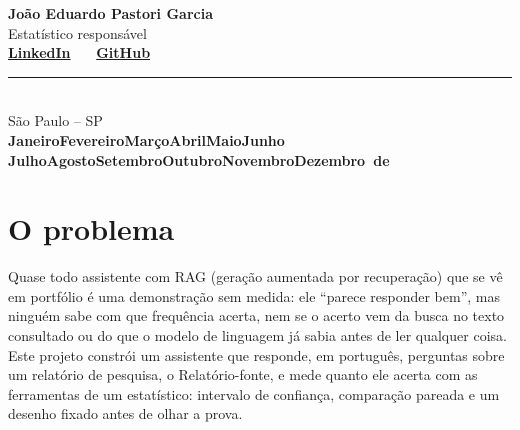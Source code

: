 \documentclass[11pt,a4paper]{article}
\newcommand{\AutorNome}{João Eduardo Pastori Garcia}
\newcommand{\AutorPapel}{Estatístico responsável}
\newcommand{\AutorLinkedIn}{https://www.linkedin.com/in/joao-eduardo-garcia/}
\newcommand{\AutorGitHub}{https://github.com/JoaoEPGarcia}
\newcommand{\LocalCapa}{São Paulo -- SP}
\newcommand{\DataCapa}{\ifcase\month\or Janeiro\or Fevereiro\or Março\or Abril\or Maio\or Junho\or
  Julho\or Agosto\or Setembro\or Outubro\or Novembro\or Dezembro\fi\ de \number\year}
\begin{document}
\begin{titlepage}
  \begin{minipage}{0.85\textwidth}
    \centering
    {\large\bfseries \AutorNome} \\
    {\normalsize\color{tinta2} \AutorPapel} \\[0.15cm]
    {\footnotesize
     \href{\AutorLinkedIn}{\color{vermelho}\textbf{LinkedIn}} \ \textperiodcentered\ \
     \href{\AutorGitHub}{\color{vermelho}\textbf{GitHub}}}
  \end{minipage}

  \vfill

  {\color{tinta2}\rule{4cm}{0.5pt}} \\[0.3cm]
  {\small\color{tinta2} \LocalCapa \\ \bfseries \DataCapa}
\end{titlepage}

\tableofcontents
\clearpage



\section{O problema}

Quase todo assistente com RAG (geração aumentada por recuperação) que se vê
em portfólio é uma demonstração sem medida: ele ``parece responder bem'', mas
ninguém sabe com que frequência acerta, nem se o acerto vem da busca no
texto consultado ou do que o modelo de linguagem já sabia antes de ler qualquer
coisa. Este projeto constrói um assistente que responde, em português,
perguntas sobre um relatório de pesquisa, o Relatório-fonte, e mede quanto ele acerta com as
ferramentas de um estatístico: intervalo de confiança, comparação pareada e
um desenho fixado antes de olhar a prova.
\end{document}
